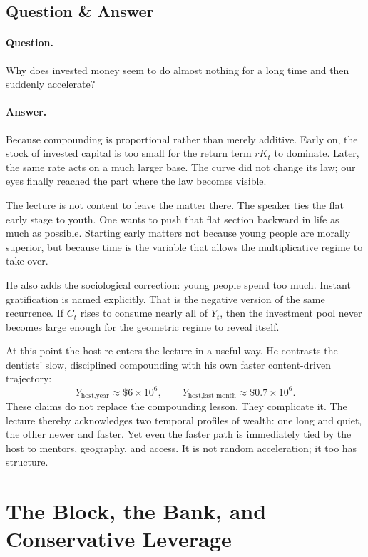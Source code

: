 \subsection{Question \& Answer}

\paragraph{Question.} Why does invested money seem to do almost nothing for a long time and then suddenly accelerate?

\paragraph{Answer.} Because compounding is proportional rather than merely additive. Early on, the stock of invested capital is too small for the return term \(rK_t\) to dominate. Later, the same rate acts on a much larger base. The curve did not change its law; our eyes finally reached the part where the law becomes visible.

The lecture is not content to leave the matter there. The speaker ties the flat early stage to youth. One wants to push that flat section backward in life as much as possible. Starting early matters not because young people are morally superior, but because time is the variable that allows the multiplicative regime to take over.

He also adds the sociological correction: young people spend too much. Instant gratification is named explicitly. That is the negative version of the same recurrence. If \(C_t\) rises to consume nearly all of \(Y_t\), then the investment pool never becomes large enough for the geometric regime to reveal itself.

At this point the host re-enters the lecture in a useful way. He contrasts the dentists' slow, disciplined compounding with his own faster content-driven trajectory:
\begin{equation}
Y_{\text{host,year}} \approx \$6 \times 10^6,
\qquad
Y_{\text{host,last month}} \approx \$0.7 \times 10^6.
\end{equation}
These claims do not replace the compounding lesson. They complicate it. The lecture thereby acknowledges two temporal profiles of wealth: one long and quiet, the other newer and faster. Yet even the faster path is immediately tied by the host to mentors, geography, and access. It is not random acceleration; it too has structure.

\section{The Block, the Bank, and Conservative Leverage}

